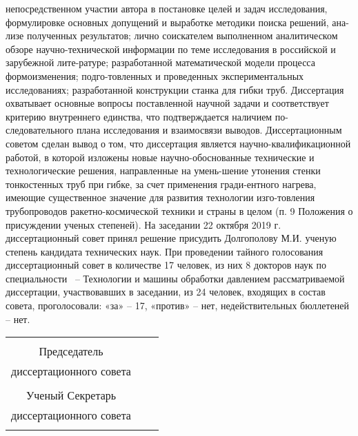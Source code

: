 непосредственном участии автора в постановке целей и задач исследования, формулировке основных допущений и выработке методики поиска решений, ана-лизе полученных результатов; 
лично соискателем выполненном аналитическом обзоре научно-технической информации по теме исследования в российской и зарубежной лите-ратуре; разработанной математической модели процесса формоизменения; подго-товленных и проведенных экспериментальных исследованиях; разработанной конструкции станка для гибки труб. 
Диссертация охватывает основные вопросы поставленной научной задачи и соответствует критерию внутреннего единства, что подтверждается наличием по-следовательного плана исследования и взаимосвязи выводов.
Диссертационным советом сделан вывод о том, что диссертация является научно-квалификационной работой, в которой изложены новые научно-обоснованные технические и технологические решения, направленные на умень-шение утонения стенки тонкостенных труб при гибке, за счет применения гради-ентного нагрева, имеющие существенное значение для развития технологии изго-товления трубопроводов ракетно-космической техники и страны в целом (п. 9 Положения 
о присуждении ученых степеней).
На заседании 22 октября 2019 г. диссертационный совет принял решение присудить Долгополову М.И. ученую степень кандидата технических наук.
При проведении тайного голосования диссертационный совет в количестве 17 человек, из них 8 докторов наук по специальности \thesisSpecialtyNumber\ – Технологии 
и машины обработки давлением рассматриваемой диссертации, участвовавших 
в заседании, из 24 человек, входящих в состав совета, проголосовали: «за» – 17, 
«против» – нет, недействительных бюллетеней – нет.


\begin{center}
	\begin{tabular}[c]{c m{4cm} l}
		&            &                     \\
		Председатель       &            &                     \\
		диссертационного совета & \hrulefill & \dcHeadFullFIO      \\
		\dcHeadRegalia      &            &                     \\
		Ученый Секретарь     &            &                     \\
		диссертационного совета & \hrulefill & \dcSecretaryFullFIO \\
		\dcSecretaryRegalia   &            &
	\end{tabular}
\end{center}


\clearpage

